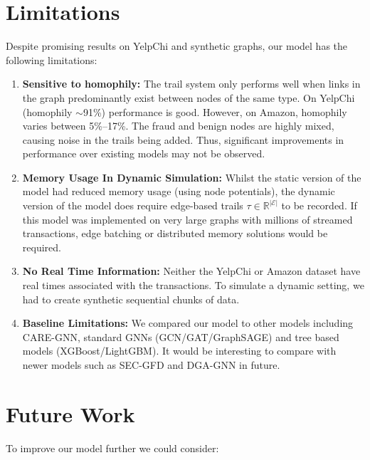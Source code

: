 \section[Limitations]{\textbf{Limitations}}
\label{sec:limitations}

Despite promising results on YelpChi and synthetic graphs, our model has the following limitations:

\begin{enumerate}
    \item \textbf{Sensitive to homophily:}
    The trail system only performs well when links in the graph predominantly exist between nodes of the same type. On YelpChi (homophily $\sim$91\%) performance is good. However, on Amazon, homophily varies between 5\%--17\%. The fraud and benign nodes are highly mixed, causing noise in the trails being added. Thus, significant improvements in performance over existing models may not be observed.
    \item \textbf{Memory Usage In Dynamic Simulation:}
    Whilst the static version of the model had reduced memory usage (using node potentials), the dynamic version of the model does require edge-based trails $\tau \in \mathbb{R}^{|\mathcal{E}|}$ to be recorded. If this model was implemented on very large graphs with millions of streamed transactions, edge batching or distributed memory solutions would be required.
    \item \textbf{No Real Time Information:}
    Neither the YelpChi or Amazon dataset have real times associated with the transactions. To simulate a dynamic setting, we had to create synthetic sequential chunks of data.
    \item \textbf{Baseline Limitations:}
    We compared our model to other models including CARE-GNN, standard GNNs (GCN/GAT/GraphSAGE) and tree based models (XGBoost/LightGBM). It would be interesting to compare with newer models such as SEC-GFD and DGA-GNN in future.
\end{enumerate}

\section[Future Work]{\textbf{Future Work}}
\label{sec:future_scope}

To improve our model further we could consider:

